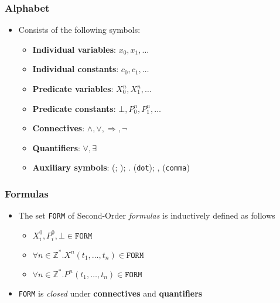 \documentclass{beamer}
\begin{document}
                \begin{frame}
                    \frametitle{Alphabet}
                    \begin{itemize}
                        \item Consists of the following symbols:
                              \begin{itemize}
                                \item \textbf{Individual variables}: $ x_0, x_1, \dots $
                                \item \textbf{Individual constants}: $ c_0, c_1, \dots $
                                \item \textbf{Predicate variables}: $ X_0^n, X_1^n, \dots $
                                \item \textbf{Predicate constants}: $ \bot, P_0^n, P_1^n, \dots $
                                \item \textbf{Connectives}: $ \wedge, \vee, \Rightarrow, \neg $
                                \item \textbf{Quantifiers}: $ \forall, \exists $
                                \item \textbf{Auxiliary symbols}: (; ); . (\texttt{dot}); , (\texttt{comma})
                              \end{itemize}
                    \end{itemize}
                \end{frame}

                \begin{frame}
                    \frametitle{Formulas}
                    \begin{itemize}
                        \item The set \texttt{FORM} of Second-Order \textit{formulas} is inductively defined as follows
                              \begin{itemize}
                                \item $ X^0_i, P^0_i, \bot \in \texttt{FORM} $
                                \item $ \forall n \in \mathbb{Z}^*. X^n(t_1, \dots, t_n) \in \texttt{FORM} $
                                \item $ \forall n \in \mathbb{Z}^*. P^n(t_1, \dots, t_n) \in \texttt{FORM} $
                              \end{itemize}
                        \item \texttt{FORM} is \textit{closed} under \textbf{connectives} and \textbf{quantifiers}
                    \end{itemize}
                \end{frame}
\end{document}
